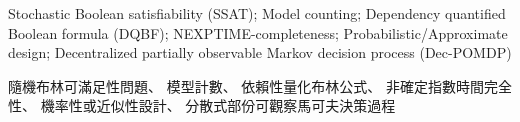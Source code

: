 




\newcommand{\myenglishkeywords}{
  Stochastic Boolean satisfiability (SSAT);
  Model counting;
  Dependency quantified Boolean formula (DQBF);
  NEXPTIME-completeness;
  Probabilistic/Approximate design;
  Decentralized partially observable Markov decision process (Dec-POMDP)
}

\newcommand{\mychinesekeywords}{
  隨機布林可滿足性問題、
  模型計數、
  依賴性量化布林公式、
  非確定指數時間完全性、
  機率性或近似性設計、
  分散式部份可觀察馬可夫決策過程
}

\renewcommand{\baselinestretch}{1.0}

\renewcommand{\baselinestretch}{2.0}

\frontmatter
\begin{abstracten}{\myenglishkeywords}
  
\end{abstracten}
\begin{abstractzh}{\mychinesekeywords}
  
\end{abstractzh}
\begin{acknowledgements}
  
\end{acknowledgements}


\tableofcontents
\mainmatter










\listoffigures
\listoftables
\cleardoublepage
{}
{}
\listofalgorithms



